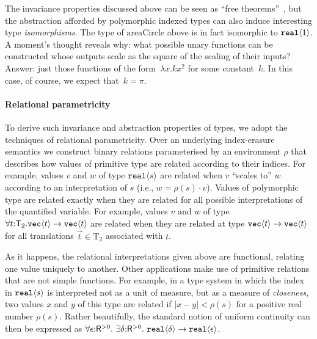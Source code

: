 \documentclass{sigplanconf}
\newcommand{\Transl}[1]{\mathrm{T}_#1}
\newcommand{\SynTransl}[1]{\mathsf{T}_#1}
\newcommand{\tyPrim}[2]{\textup{\texttt{#1}}\langle #2 \rangle}
\theoremstyle{examplestyle}
\theoremstyle{restatementstyle}
\begin{document}
The invariance properties discussed above can be seen as ``free
theorems''~\cite{wadler89theorems}, but the abstraction afforded by
polymorphic indexed types can also induce interesting type
\emph{isomorphisms}.  The type of $\mathrm{areaCircle}$ above is in
fact isomorphic to $\tyPrim{real}{1}$. A moment's thought reveals why:
what possible unary functions can be constructed whose outputs scale
as the square of the scaling of their inputs?  Answer: just those
functions of the form~$\lambda x. k x^2$ for some constant~$k$.  In
this case, of course, we expect that~$k = \pi$.

\paragraph{Relational parametricity}
To derive such invariance and abstraction properties of types, we
adopt the techniques of relational parametricity. Over an underlying
index-erasure semantics we construct binary relations parameterised by
an environment $\rho$ that describes how values of primitive type are
related according to their indices.  For example, values $v$ and $w$
of type $\tyPrim{real}s$ are related when $v$ ``scales to'' $w$
according to an interpretation of $s$ (i.e., $w=\rho(s)\cdot
v$).  Values of polymorphic type are related exactly when they are
related for all possible interpretations of the quantified
variable. For example, values $v$ and $w$ of type
$\forall t\mathord:\SynTransl{2}.\tyPrim{vec} t\to
\tyPrim{vec} t$ are related when they are related at type
$\tyPrim{vec} t\to\tyPrim{vec}t$ for all translations
$\vec t\in\Transl{2}$ associated with $t$.

As it happens, the relational interpretations given above are
functional, relating one value uniquely to another. Other applications
make use of primitive relations that are not simple functions.
For example, in a type system in which the index in
$\tyPrim{real}s$ is interpreted not as a unit of measure, but as
a measure of \emph{closeness}, two values $x$ and $y$ of this type are
related if $|x-y| < \rho(s)$ for a positive real number
$\rho(s)$.  Rather beautifully, the standard notion of uniform
continuity can then be expressed as %
 $ \forall \epsilon \mathord: \mathsf{R}^{>0}.\ \exists \delta\mathord: \mathsf{R}^{>0}.\ \tyPrim{real}{\delta} \to \tyPrim{real}{\epsilon}$.
\end{document}
